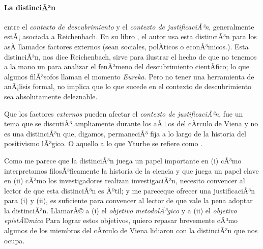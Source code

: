 \paragraph{La distinciÃ³n} entre el \emph{contexto de descubrimiento} y el \emph{contexto de justificaciÃ³n}, generalmente estÃ¡ asociada a Reichenbach.
En su libro , el autor usa esta distinciÃ³n para  los asÃ­ llamados factores externos (sean sociales, polÃ­ticos o econÃ³micos.).
Esta distinciÃ³n, nos dice Reichenbach, sirve para ilustrar el hecho de que no tenemos a la mano un  para analizar el fenÃ³meno del descubrimiento cientÃ­fico; lo que algunos filÃ³sofos \parencite{reichenbach1938experience, Seo2015} llaman el momento \emph{Eureka}.
Pero no tener una herramienta de anÃ¡lisis formal, no implica que lo que sucede en el contexto de descubrimiento sea absolutamente deleznable.

Que los factores \emph{externos} pueden afectar el \emph{contexto de justificaciÃ³n}, fue un tema que se discutiÃ³ ampliamente durante los aÃ±os del cÃ­rculo de Viena y no es una distinciÃ³n que, digamos,  permaneciÃ³ fija a lo largo de la historia del positivismo lÃ³gico. 
O aquello a lo que Yturbe se refiere como .

Como me parece que la distinciÃ³n juega un papel importante en (i) cÃ³mo interpretamos filosÃ³ficamente la historia de la ciencia y que juega un papel clave en (ii) cÃ³mo los investigadores realizan investigaciÃ³n, necesito convencer al lector de que esta distinciÃ³n es Ãºtil; 
y me pareceque ofrecer una justificaciÃ³n para (i) y (ii), es suficiente para convencer al lector de que vale la pena adoptar la distinciÃ³n.
LlamarÃ© a (i) el \emph{objetivo metodolÃ³gico} y a (ii) el \emph{objetivo epistÃ©mico}
Para lograr estos objetivos, quiero repasar brevemente cÃ³mo algunos de los miembros del cÃ­rculo de Viena lidiaron con la distinciÃ³n que nos ocupa.


